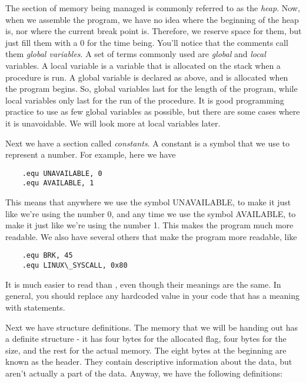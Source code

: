 The section of memory being managed is commonly referred to as the \emph{heap}.  Now,
when we assemble the program, we have no idea where the beginning of the heap is, nor where the
current break point is.  Therefore, we reserve space for them, but just fill them with a 0 for the
time being.  You'll notice that the comments call them \emph{global variables}.  
A set of terms commonly used are \emph{global} and \emph{local} variables.
A local variable is a variable that is allocated on the stack when a procedure is run.  A global
variable is declared as above, and is allocated when the program begins.  So, global variables last
for the length of the program, while local variables only last for the run of the procedure.  It is
good programming practice to use as few global variables as possible, but there are some cases
where it is unavoidable.  We will look more at local variables later.

Next we have a section called \emph{constants}.  A constant is a symbol that we
use to represent a number.  For example, here we have

\begin{simpletyping}
\begin{lstlisting}
	.equ UNAVAILABLE, 0
	.equ AVAILABLE, 1
\end{lstlisting}
\end{simpletyping}

This means that anywhere we use the symbol UNAVAILABLE, to make it just like we're using the
number 0, and any time we use the symbol AVAILABLE, to make it just like we're using the number 1.
This makes the program much more readable.  We also have several others that make the program more
readable, like

\begin{simpletyping}
\begin{lstlisting}
	.equ BRK, 45
	.equ LINUX\_SYSCALL, 0x80
\end{lstlisting}
\end{simpletyping}

It is much easier to read  than ,
even though their meanings are the same.  In general, you should replace any hardcoded
value in your code that has a meaning with  statements.

Next we have structure definitions.  The memory that we will be handing out has a definite
structure - it has four bytes for the allocated flag, four bytes for the size, and the rest
for the actual memory.  The eight bytes at the beginning are known as the header.  They
contain descriptive information about the data, but aren't actually a part of the data.  Anyway,
we have the following definitions:

